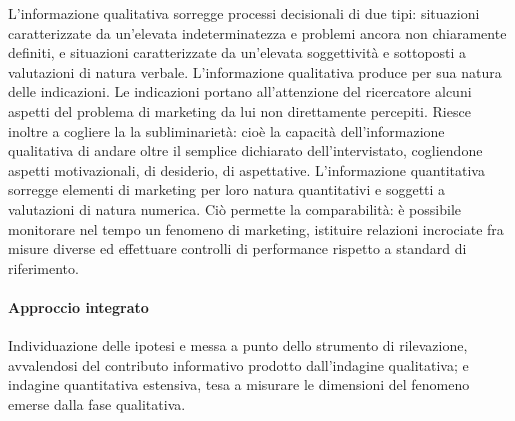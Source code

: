 L’informazione qualitativa sorregge processi decisionali di due tipi: situazioni caratterizzate da un’elevata indeterminatezza e problemi ancora non chiaramente definiti, e situazioni caratterizzate da un’elevata soggettività e sottoposti a valutazioni di natura verbale. L’informazione qualitativa produce per sua natura delle indicazioni. \newline
Le indicazioni portano all'attenzione del ricercatore alcuni aspetti del problema di marketing da lui non direttamente percepiti. \newline
Riesce inoltre a cogliere la la subliminarietà: cioè la capacità dell'informazione qualitativa di andare oltre il semplice dichiarato dell'intervistato, cogliendone aspetti motivazionali, di desiderio, di aspettative. \newline
L’informazione quantitativa sorregge elementi di marketing per loro natura quantitativi e soggetti a valutazioni di natura numerica. Ciò permette la comparabilità: è possibile monitorare nel tempo un fenomeno di marketing, istituire relazioni incrociate fra misure diverse ed effettuare controlli di performance rispetto a standard di riferimento.

\paragraph{Approccio integrato}
Individuazione delle ipotesi e messa a punto dello strumento di rilevazione, avvalendosi del contributo informativo prodotto dall'indagine qualitativa; e indagine quantitativa estensiva, tesa a misurare le dimensioni del fenomeno emerse dalla fase qualitativa.


